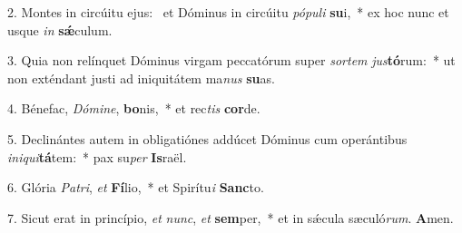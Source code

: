 2. Montes in circúitu ejus: \dag\  et Dóminus in circúitu \textit{pó}\textit{pu}\textit{li} \textbf{su}i,~*  ex hoc nunc et usque \textit{in} \textbf{sǽ}culum.\

3. Quia non relínquet Dóminus virgam peccatórum super \textit{sor}\textit{tem} \textit{jus}\textbf{tó}rum:~*  ut non exténdant justi ad iniquitátem ma\textit{nus} \textbf{su}as.\

4. Bénefac, \textit{Dó}\textit{mi}\textit{ne}, \textbf{bo}nis,~*  et rec\textit{tis} \textbf{cor}de.\

5. Declinántes autem in obligatiónes addúcet Dóminus cum operántibus \textit{in}\textit{i}\textit{qui}\textbf{tá}tem:~*  pax su\textit{per} \textbf{Is}raël.\

6. Glória \textit{Pa}\textit{tri}, \textit{et} \textbf{Fí}lio,~*  et Spirítu\textit{i} \textbf{Sanc}to.\

7. Sicut erat in princípio, \textit{et} \textit{nunc}, \textit{et} \textbf{sem}per,~*  et in sǽcula sæculó\textit{rum}. \textbf{A}men.\


